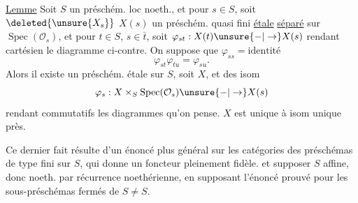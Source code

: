 \uline{Lemme} Soit $S$ un préschém. loc noeth., et pour  $s\in S$, soit $\deleted{\unsure{X_s}}$ $X(s)$ un préschém. quasi fini \uline{étale} \uline{séparé} sur $\operatorname{Spec}(\mathcal O_s)$, et pour $t\in S$, $s\in\overline t$, soit $\varphi_{st}:X(t)\unsure{-|\to}X(s)$ rendant cartésien le diagramme ci-contre.
On suppose que $\varphi_{ss}=\text{identité}$
\[
\varphi_{st}\varphi_{tu}=\varphi_{su}.
\]
Alors il existe un préschém. étale  sur $S$, soit $X$, et des isom
\[
\varphi_s:X\times_S\operatorname{Spec}(\mathcal O_s)\unsure{-|\to}X(s)
\]
rendant commutatifs les diagrammes qu'on pense. $X$ est unique à isom unique près.

Ce dernier fait résulte d'un énoncé plus général sur les catégories des préschémas de type fini sur $S$, qui donne un foncteur pleinement fidèle.  et supposer $S$ affine, donc noeth.  par récurrence noethérienne, en supposant l'énoncé prouvé pour les sous-préschémas fermés de $S\ne S$.
